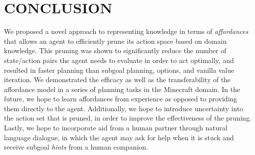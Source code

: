 \documentclass[]{article}
\begin{document}

\section{CONCLUSION}

We proposed a novel approach to representing
knowledge in terms of {\em
  affordances}~\citep{gibson77} that allows an agent to efficiently prune its
action space based on domain knowledge. This pruning was shown to significantly
reduce the number of state/action pairs the agent needs to evaluate
in order to act optimally, and resulted in faster planning than subgoal planning, options,
and vanilla value iteration. We demonstrated the efficacy as well as the 
transferability of the affordance model in a series of planning tasks in the Minecraft domain.
In the future, we hope to learn affordances from experience as opposed to providing them directly
to the agent. Additionally, we hope to introduce uncertainty into the action set that is 
pruned, in order to improve the effectiveness of the pruning. Lastly, we 
hope to incorporate aid from a human partner through natural language dialogue, in which
the agent may ask for help when it is stuck and receive subgoal {\it hints} from a human
companion.


  
\end{document}
